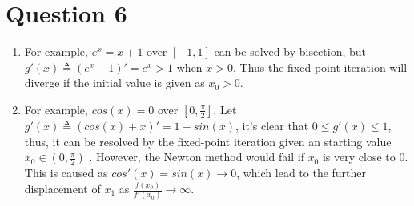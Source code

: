 \documentclass[paper=a4, fontsize=11pt]{scrartcl} %
\numberwithin{equation}{section} %
\numberwithin{figure}{section} %
\numberwithin{table}{section} %
\begin{document}
\section{Question 6}
	\begin{enumerate}
		\item 
			For example, $e^x = x+1$ over $[-1, 1]$ can be solved by bisection, but $g'(x) \triangleq (e^x-1)' = e^x > 1$ when $x>0$. Thus the fixed-point iteration will diverge if the initial value is given as $x_0 > 0$.
		\item 
			For example, $cos(x) = 0$ over $[0, \frac{\pi}{2}]$. Let $g'(x)\triangleq (cos(x)+x)' = 1-sin(x)$, it's clear that $0 \leq g'(x) \leq 1$, thus, it can be resolved by the fixed-point iteration given an starting value $x_0 \in (0, \frac{\pi}{2})$ . However, the Newton method would fail if $x_0$ is very close to $0$. This is caused as $cos'(x) = sin(x) \rightarrow 0$, which lead to the further displacement of $x_1$ as $\frac{f(x_0)}{f'(x_0)}\rightarrow\infty$.
		
	\end{enumerate}
\end{document}
